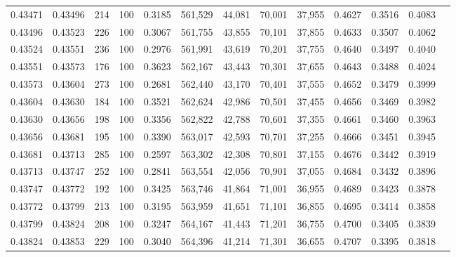 \begin{tabular}{rrrrrrrrrrrrr}
0.43471 & 0.43496 &    214 & 100 &                                     0.3185 & 561,529 &  44,081 &  70,001 &  37,955 & 0.4627 & 0.3516 & 0.4083 \\
0.43496 & 0.43523 &    226 & 100 &                                     0.3067 & 561,755 &  43,855 &  70,101 &  37,855 & 0.4633 & 0.3507 & 0.4062 \\
0.43524 & 0.43551 &    236 & 100 &                                     0.2976 & 561,991 &  43,619 &  70,201 &  37,755 & 0.4640 & 0.3497 & 0.4040 \\
0.43551 & 0.43573 &    176 & 100 &                                     0.3623 & 562,167 &  43,443 &  70,301 &  37,655 & 0.4643 & 0.3488 & 0.4024 \\
0.43573 & 0.43604 &    273 & 100 &                                     0.2681 & 562,440 &  43,170 &  70,401 &  37,555 & 0.4652 & 0.3479 & 0.3999 \\
0.43604 & 0.43630 &    184 & 100 &                                     0.3521 & 562,624 &  42,986 &  70,501 &  37,455 & 0.4656 & 0.3469 & 0.3982 \\
0.43630 & 0.43656 &    198 & 100 &                                     0.3356 & 562,822 &  42,788 &  70,601 &  37,355 & 0.4661 & 0.3460 & 0.3963 \\
0.43656 & 0.43681 &    195 & 100 &                                     0.3390 & 563,017 &  42,593 &  70,701 &  37,255 & 0.4666 & 0.3451 & 0.3945 \\
0.43681 & 0.43713 &    285 & 100 &                                     0.2597 & 563,302 &  42,308 &  70,801 &  37,155 & 0.4676 & 0.3442 & 0.3919 \\
0.43713 & 0.43747 &    252 & 100 &                                     0.2841 & 563,554 &  42,056 &  70,901 &  37,055 & 0.4684 & 0.3432 & 0.3896 \\
0.43747 & 0.43772 &    192 & 100 &                                     0.3425 & 563,746 &  41,864 &  71,001 &  36,955 & 0.4689 & 0.3423 & 0.3878 \\
0.43772 & 0.43799 &    213 & 100 &                                     0.3195 & 563,959 &  41,651 &  71,101 &  36,855 & 0.4695 & 0.3414 & 0.3858 \\
0.43799 & 0.43824 &    208 & 100 &                                     0.3247 & 564,167 &  41,443 &  71,201 &  36,755 & 0.4700 & 0.3405 & 0.3839 \\
0.43824 & 0.43853 &    229 & 100 &                                     0.3040 & 564,396 &  41,214 &  71,301 &  36,655 & 0.4707 & 0.3395 & 0.3818 \\

\end{tabular}

